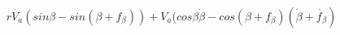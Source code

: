 \documentclass[preview]{standalone}
\begin{document}
	\begin{equation*}
	r  \dot{V_a}(sin\beta-sin(\beta+f_\beta)) + V_a(cos\beta \dot{\beta} - cos(\beta+f_\beta)(\dot{\beta}+\dot{f_\beta})
	\end{equation*}
\end{document}
